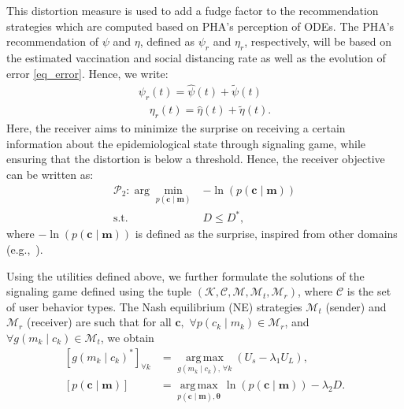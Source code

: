 \documentclass[sigconf,review]{acmart}
\DeclareMathOperator*{\argmax}{arg\,max}
\begin{document}
\noindent
This distortion measure is used to add a fudge factor to the recommendation strategies which are computed based on PHA's perception of ODEs.
The PHA's recommendation of $\psi$ and $\eta$, defined as $\psi_r$ and $\eta_r$, respectively,  will be based on the estimated vaccination and social distancing rate as well as the evolution of error \eqref{eq_error}. Hence, we write:
\begin{align}
    \psi_r(t) = \widehat{\psi}(t) + \tilde{\psi}(t) \nonumber \\
    \quad \eta_r(t) = \widehat{\eta}(t) + \tilde{\eta}(t).
\end{align}
\label{eq:combined_params}
Here, the receiver aims to minimize the surprise on receiving a certain information about the epidemiological state through signaling game, while ensuring that the distortion is below a threshold. Hence, the receiver objective can be written as:
\begin{align}
    \mathcal{P}_2 : \arg\min_{p(\mathbf{c} \mid \mathbf{m})} &-\ln\left(p(\mathbf{c} \mid \mathbf{m})\right) \nonumber \\
   \textrm{s.t.}\,\,& D\leq D^{\ast},
\end{align}
\noindent  where $-\ln (p(\boldsymbol{c}\mid\boldsymbol{m}))$ is defined as the surprise, inspired from %
other domains (e.g.,~\cite{ChristoTWCArxiv2022}).

Using the utilities defined above, we further formulate the solutions of the signaling game defined using the tuple $\left(\mathcal{K},\mathcal{C},\mathcal{M},\mathcal{M}_t,\mathcal{M}_r\right)$, where $\mathcal{C}$ is the set of user behavior types.  The Nash equilibrium (NE) strategies $\mathcal{M}_t$ (sender) and $\mathcal{M}_r$ (receiver) are such that for all $\boldsymbol{c},$ $\forall p(c_k \mid m_k) \in \mathcal{M}_r$, and $\forall g(m_k \mid c_k) \in \mathcal{M}_t$, we obtain
\begin{equation}
    \begin{aligned}
        \left[g(m_k \mid c_k)^{\ast}\right]_{\forall k} &= \argmax\limits_{g(m_k \mid c_k),\, \forall k} \left( U_s - \lambda_1 U_L \right),\\
        \left[p(\boldsymbol{c}\mid\boldsymbol{m})\right] &= \argmax\limits_{p(\boldsymbol{c}\mid\boldsymbol{m}),\boldsymbol{\theta}} \ln\left(p(\mathbf{c} \mid \mathbf{m})\right)-\lambda_2D.
    \end{aligned}
\end{equation}
\end{document}
